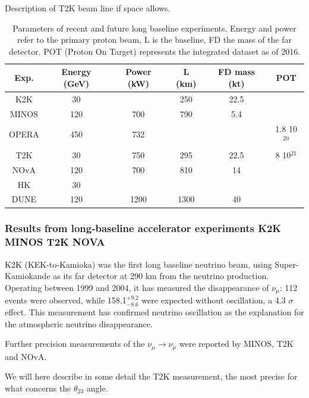 \documentclass[preprint,12pt]{elsarticle}
\begin{document}
Description of T2K beam line if space allows.

\begin{table}
\centering
\begin{tabular}{|c|c|c|c|c|c|}
  \hline
  Exp. & Energy (GeV) & Power (kW) & L (km) & FD mass (kt) & POT \\ 
  \hline
K2K & 30 & & 250 & 22.5 & \\
MINOS & 120 & 700 & 790 & 5.4 &\\
OPERA & 450 & 732 &  & & 1.8 10$^{20}$\\
T2K & 30 & 750 & 295 & 22.5 & 8 10$^{21}$\\
NOvA & 120 & 700& 810 & 14 & \\
HK & 30 & & & & \\
DUNE & 120 & 1200 & 1300 & 40 &\\
  \hline
\end{tabular}
\caption{Parameters of recent and future long baseline experiments. Energy and power refer to the primary proton beam, L is the baseline, FD the mass of the far detector. POT (Proton On Target) represents the integrated dataset as of 2016.}
\end{table}


\subsubsection{Results from long-baseline accelerator experiments K2K MINOS T2K NOVA}

K2K (KEK-to-Kamioka) was the first long baseline neutrino beam, using Super-Kamiokande as its far detector at 290 km from the neutrino production. Operating between 1999 and 2004, it has measured the disappearance of $\nu_\mu$: 112 events were observed, while 158.1$^{+9.2}_{-8.6}$ were expected without oscillation, a 4.3 $\sigma$ effect. This measurement has confirmed neutrino oscillation as the explanation for the atmospheric neutrino disappearance. 

Further precision measurements of the $\nu_\mu \rightarrow \nu_\mu$ were reported by MINOS, T2K and NOvA.

We will here describe in some detail the T2K measurement, the most precise for what concerns the $\theta_{23}$ angle.
\end{document}
